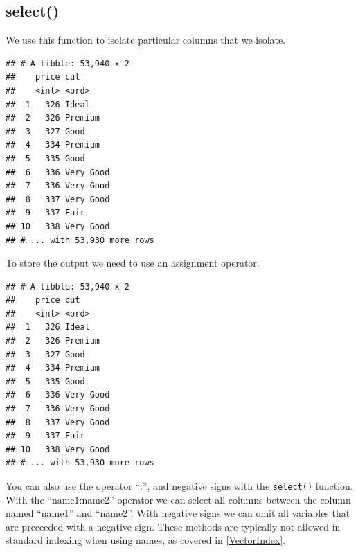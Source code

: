 \documentclass[
]{book}
\newenvironment{Shaded}{\begin{snugshade}}{\end{snugshade}}
\newcommand{\KeywordTok}[1]{\textcolor[rgb]{0.13,0.29,0.53}{\textbf{#1}}}
\newcommand{\NormalTok}[1]{#1}
\newcommand{\OperatorTok}[1]{\textcolor[rgb]{0.81,0.36,0.00}{\textbf{#1}}}
\newcommand{\StringTok}[1]{\textcolor[rgb]{0.31,0.60,0.02}{#1}}
\begin{document}
\hypertarget{select}{%
\subsection{select()}\label{select}}

We use this function to isolate particular columns that we isolate.

\begin{Shaded}
\end{Shaded}

\begin{verbatim}
## # A tibble: 53,940 x 2
##    price cut      
##    <int> <ord>    
##  1   326 Ideal    
##  2   326 Premium  
##  3   327 Good     
##  4   334 Premium  
##  5   335 Good     
##  6   336 Very Good
##  7   336 Very Good
##  8   337 Very Good
##  9   337 Fair     
## 10   338 Very Good
## # ... with 53,930 more rows
\end{verbatim}

To store the output we need to use an assignment operator.

\begin{Shaded}
\end{Shaded}

\begin{verbatim}
## # A tibble: 53,940 x 2
##    price cut      
##    <int> <ord>    
##  1   326 Ideal    
##  2   326 Premium  
##  3   327 Good     
##  4   334 Premium  
##  5   335 Good     
##  6   336 Very Good
##  7   336 Very Good
##  8   337 Very Good
##  9   337 Fair     
## 10   338 Very Good
## # ... with 53,930 more rows
\end{verbatim}

You can also use the operator ``:'', and negative signs with the \texttt{select()} function. With the ``name1:name2'' operator we can select all columns between the column named ``name1'' and ``name2''. With negative signs we can omit all variables that are preceeded with a negative sign. These methods are typically not allowed in standard indexing when using names, as covered in \ref{VectorIndex}.
\end{document}
